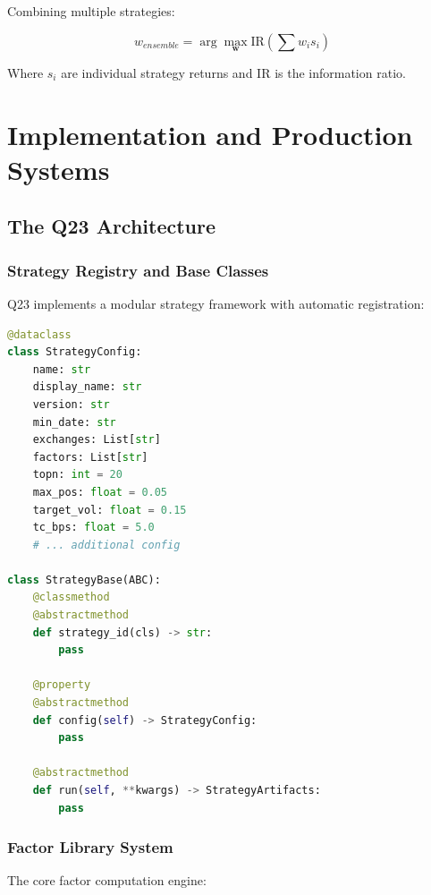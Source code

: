 \documentclass[11pt,letterpaper]{book}
\newcommand{\IR}{\mathrm{IR}}
\begin{document}
Combining multiple strategies:

\begin{equation}
w_{ensemble} = \arg\max_{\mathbf{w}} \IR(\sum w_i s_i)
\end{equation}

Where $s_i$ are individual strategy returns and $\IR$ is the information ratio.

\chapter{Implementation and Production Systems}

\section{The Q23 Architecture}

\subsection{Strategy Registry and Base Classes}

Q23 implements a modular strategy framework with automatic registration:

\begin{lstlisting}[language=Python,caption=Q23 Strategy Registry]
@dataclass
class StrategyConfig:
    name: str
    display_name: str
    version: str
    min_date: str
    exchanges: List[str]
    factors: List[str]
    topn: int = 20
    max_pos: float = 0.05
    target_vol: float = 0.15
    tc_bps: float = 5.0
    # ... additional config

class StrategyBase(ABC):
    @classmethod
    @abstractmethod
    def strategy_id(cls) -> str:
        pass
    
    @property
    @abstractmethod
    def config(self) -> StrategyConfig:
        pass
    
    @abstractmethod
    def run(self, **kwargs) -> StrategyArtifacts:
        pass
\end{lstlisting}

\subsection{Factor Library System}

The core factor computation engine:
\end{document}
